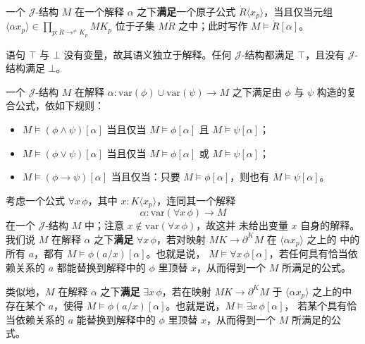 \begin{definition}\label{def:satisfies-atomic}
一个 $\mathcal{J}$-结构 $M$ 在一个解释 $\alpha$ 之下\textbf{满足}一个原子公式
$\dot{R}\langle x_{p}\rangle$，当且仅当元组
$\langle\alpha x_{p}\rangle\in\prod_{p\colon \dot{R}\to^{\neq}K_{p}}MK_{p}$ 位于子集
$M\dot{R}$ 之中；此时写作 $M\models\dot{R}[\alpha]$。
\end{definition}

语句 $\top$ 与 $\bot$ 没有变量，故其语义独立于解释。任何 $\mathcal{J}$-结构都满足
$\top$，且没有 $\mathcal{J}$-结构满足 $\bot$。

\begin{definition}\label{def:satisfies-compound}
一个 $\mathcal{J}$-结构 $M$ 在解释
$\alpha\colon\mathrm{var}(\phi)\cup\mathrm{var}(\psi)\to M$ 之下满足由 $\phi$ 与
$\psi$ 构造的复合公式，依如下规则：
\begin{itemize}
\item $M\models(\phi\wedge\psi)[\alpha]$ 当且仅当 $M\models\phi[\alpha]$ 且
  $M\models\psi[\alpha]$；
\item $M\models(\phi\vee\psi)[\alpha]$ 当且仅当 $M\models\phi[\alpha]$ 或
  $M\models\psi[\alpha]$；
\item $M\models(\phi\rightarrow\psi)[\alpha]$ 当且仅当：只要
  $M\models\phi[\alpha]$，则也有 $M\models\psi[\alpha]$。
\end{itemize}
\end{definition}

\begin{definition}\label{def:satisfies-forall}
考虑一个公式 $\forall x\,\phi$，其中 $x:K\langle x_{p}\rangle$，连同其一个解释
\begin{equation*}
\alpha\colon\mathrm{var}(\forall x\,\phi)\to M
\end{equation*}
在一个 $\mathcal{J}$-结构 $M$ 中；注意 $x\notin\mathrm{var}(\forall x\,\phi)$，故这并
未给出变量 $x$ 自身的解释。我们说 $M$ 在解释 $\alpha$ 之下\textbf{满足}
$\forall x\,\phi$，若对映射 $MK\to\partial^{K}M$ 在 $\langle\alpha x_{p}\rangle$ 之上的%
\trFiber{}中的所有 $a$，都有 $M\models\phi(a/x)[\alpha]$。也就是说，
$M\models\forall x\,\phi[\alpha]$，若任何具有恰当依赖关系的 $a$ 都能替换到解释中的
$\phi$ 里顶替 $x$，从而得到一个 $M$ 所满足的公式。

类似地，$M$ 在解释 $\alpha$ 之下\textbf{满足} $\exists x\,\phi$，若在映射
$MK\to\partial^{K}M$ 于 $\langle\alpha x_{p}\rangle$ 之上的\trFiber{}中存在某个
$a$，使得 $M\models\phi(a/x)[\alpha]$。也就是说，$M\models\exists x\,\phi[\alpha]$，
若某个具有恰当依赖关系的 $a$ 能替换到解释中的 $\phi$ 里顶替 $x$，从而得到一个
$M$ 所满足的公式。
\end{definition}

